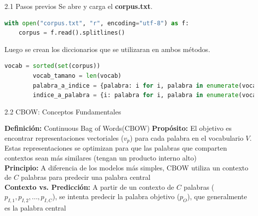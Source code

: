 \documentclass{beamer}
\begin{document}
	
\begin{frame}[fragile]{2.1 Pasos previos}
	\justifying
	Se abre y carga el \textbf{corpus.txt}.
	
	\begin{lstlisting}[language=Python]
with open("corpus.txt", "r", encoding="utf-8") as f:
	corpus = f.read().splitlines()
	\end{lstlisting}
	Luego se crean los diccionarios que se utilizaran en ambos métodos.
	\begin{lstlisting}[language=Python]
    vocab = sorted(set(corpus))
		vocab_tamano = len(vocab)
		palabra_a_indice = {palabra: i for i, palabra in enumerate(vocab)}
		indice_a_palabra = {i: palabra for i, palabra in enumerate(vocab)}
	\end{lstlisting}

\end{frame}
		
\begin{frame}[fragile]{2.2 CBOW: Conceptos Fundamentales}
	\begin{block}{\textbf{Definición:} Continuous Bag of Words(CBOW)}
		\justifying
		\vspace{0.1cm}
		\textbf{Propósito:} El objetivo es encontrar representaciones vectoriales ($v_p$) para cada palabra en el vocabulario $V$. Estas representaciones se optimizan para que las palabras que comparten contextos sean más similares (tengan un producto interno alto)\\
		\vspace{0.1cm}
		\textbf{Principio:} A diferencia de los modelos más simples, CBOW utiliza un contexto de $C$ palabras para predecir una palabra central\\
		\vspace{0.1cm}
		\textbf{Contexto vs. Predicción:}  A partir de un contexto de $C$ palabras ($p_{I,1}, p_{I,2}, ..., p_{I,C}$), se intenta predecir la palabra objetivo ($p_O$), que generalmente es la palabra central
	\end{block}
	
\end{frame}
\end{document}
